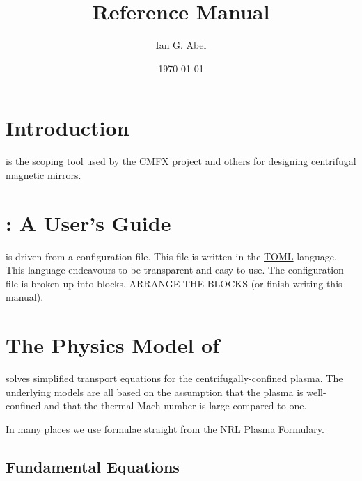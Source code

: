 \documentclass{revtex4}
\begin{document}
\date{\today}

\title{\mctrans{} Reference Manual}
\author{Ian G. Abel}


\maketitle
\section{Introduction}

\mctrans{} is the scoping tool used by the CMFX project and others for designing centrifugal magnetic mirrors.

\section{\mctrans{}: A User's Guide}

\mctrans{} is driven from a configuration file. This file is written in the \href{https://github.com/toml-lang/toml}{TOML} language. This language endeavours
to be transparent and easy to use. The configuration file is broken up into blocks. ARRANGE THE BLOCKS (or finish writing this manual).

\section{The Physics Model of \mctrans{}}

\mctrans{} solves simplified transport equations for the centrifugally-confined plasma. The underlying models are all based on the assumption that the plasma is well-confined and that the thermal Mach number is large compared to one.

In many places we use formulae straight from the NRL Plasma Formulary. 

\subsection{Fundamental Equations}
\end{document}

